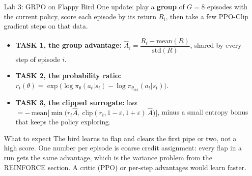 \begin{frame}{Lab 3: GRPO on Flappy Bird}
One update: play a \textbf{group} of $G = 8$ episodes with the current policy, score each episode by its return $R_i$, then take a few PPO-Clip gradient steps on that data.
\vspace{0.3em}
\begin{itemize}\itemsep0.5em
    \item \textbf{TASK 1, the group advantage:} $\hat{A}_i = \dfrac{R_i - \mathrm{mean}(R)}{\mathrm{std}(R)}$, shared by every step of episode $i$.
    \item \textbf{TASK 2, the probability ratio:} $r_t(\theta) = \exp\!\big(\log \pi_\theta(a_t|s_t) - \log \pi_{\theta_\text{old}}(a_t|s_t)\big)$.
    \item \textbf{TASK 3, the clipped surrogate:} loss $= -\,\mathrm{mean}\big[\min\big(r_t \hat{A},\ \mathrm{clip}(r_t, 1-\varepsilon, 1+\varepsilon)\, \hat{A}\big)\big]$, minus a small entropy bonus that keeps the policy exploring.
\end{itemize}
\vspace{0.3em}
\begin{block}{What to expect}
The bird learns to flap and clears the first pipe or two, not a high score. One number per episode is coarse credit assignment: every flap in a run gets the same advantage, which is the variance problem from the REINFORCE section. A critic (PPO) or per-step advantages would learn faster.
\end{block}
\end{frame}
